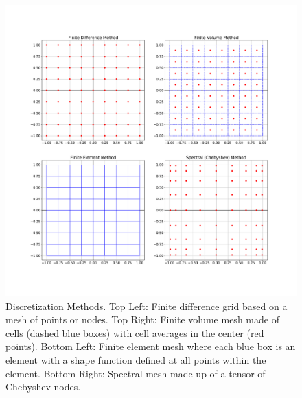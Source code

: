 \begin{figure}
    \centering
    \includegraphics[width=0.8\columnwidth]{figures/PDE_discretization_methods.pdf}
    \caption{Discretization Methods. Top Left: Finite difference grid based on a mesh of points or nodes. Top Right: Finite volume mesh made of cells (dashed blue boxes) with cell averages in the center (red points). Bottom Left: Finite element mesh where each blue box is an element with a shape function defined at all points within the element. Bottom Right: Spectral mesh made up of a tensor of Chebyshev nodes.}
    \label{fig:discretization_methods}
\end{figure}

